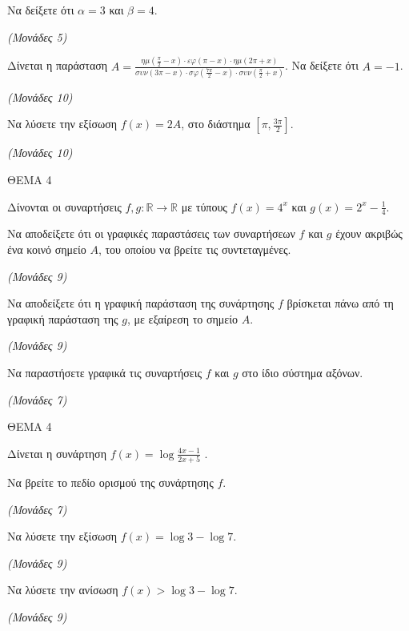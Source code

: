 \documentclass[11pt,a4paper,twoside]{book}
\newcommand{\monades}[1]{\hfill \textit{(Μονάδες #1)}}
\begin{document}
\begin{alist}
\item Να δείξετε ότι $\alpha = 3$ και $\beta = 4$.

\monades{5}

\item Δίνεται η παράσταση $A = \frac{\eta\mu\left(\frac{\pi}{2} - x\right) \cdot \varepsilon\varphi(\pi - x) \cdot \eta\mu(2\pi + x)}{\sigma\upsilon\nu(3\pi - x) \cdot \sigma\varphi\left(\frac{7\pi}{2} - x\right) \cdot \sigma\upsilon\nu\left(\frac{\pi}{2} + x\right)}$. Να δείξετε ότι $A = -1$.

\monades{10}

\item Να λύσετε την εξίσωση $f(x) = 2A$, στο διάστημα $\left[\pi, \frac{3\pi}{2}\right]$.

\monades{10}
\end{alist}

\vspace{4mm}

ΘΕΜΑ 4

Δίνονται οι συναρτήσεις $f, g: \mathbb{R} \rightarrow \mathbb{R}$ με τύπους $f(x) = 4^x$ και $g(x) = 2^x - \frac{1}{4}$.

\begin{alist}
\item Να αποδείξετε ότι οι γραφικές παραστάσεις των συναρτήσεων $f$ και $g$ έχουν ακριβώς ένα κοινό σημείο $A$, του οποίου να βρείτε τις συντεταγμένες.

\monades{9}

\item Να αποδείξετε ότι η γραφική παράσταση της συνάρτησης $f$ βρίσκεται πάνω από τη γραφική παράσταση της $g$, με εξαίρεση το σημείο $A$.

\monades{9}

\item Να παραστήσετε γραφικά τις συναρτήσεις $f$ και $g$ στο ίδιο σύστημα αξόνων.

\monades{7}
\end{alist}

\vspace{4mm}

ΘΕΜΑ 4

Δίνεται η συνάρτηση $f(x) = \log\frac{4x - 1}{2x + 5}$ .

\begin{alist}
\item Να βρείτε το πεδίο ορισμού της συνάρτησης $f$.

\monades{7}

\item Να λύσετε την εξίσωση $f(x) = \log 3 - \log 7$.

\monades{9}

\item Να λύσετε την ανίσωση $f(x) > \log 3 - \log 7$.

\monades{9}
\end{alist}
\end{document}

